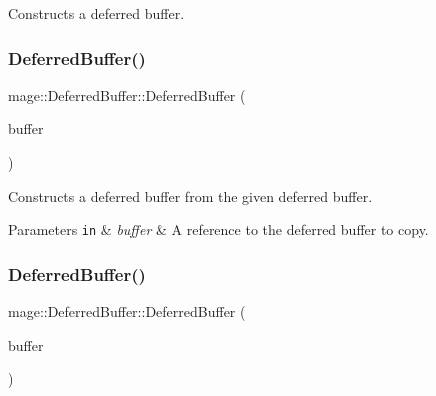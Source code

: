Constructs a deferred buffer. \hypertarget{structmage_1_1_deferred_buffer_ad796b5dcb9cf2e912a08054f2be16692}{}\label{structmage_1_1_deferred_buffer_ad796b5dcb9cf2e912a08054f2be16692} 
\subsubsection{\texorpdfstring{Deferred\+Buffer()}{DeferredBuffer()}\hspace{0.1cm}{\footnotesize\ttfamily [2/3]}}
{\footnotesize\ttfamily mage\+::\+Deferred\+Buffer\+::\+Deferred\+Buffer (\begin{DoxyParamCaption}\item[{const \hyperlink{structmage_1_1_deferred_buffer}{Deferred\+Buffer} \&}]{buffer }\end{DoxyParamCaption})\hspace{0.3cm}{\ttfamily [default]}}

Constructs a deferred buffer from the given deferred buffer.


\begin{DoxyParams}[1]{Parameters}
\mbox{\tt in}  & {\em buffer} & A reference to the deferred buffer to copy. \\
\hline
\end{DoxyParams}
\hypertarget{structmage_1_1_deferred_buffer_a525c6c26dfe871840328ee8953765071}{}\label{structmage_1_1_deferred_buffer_a525c6c26dfe871840328ee8953765071} 
\subsubsection{\texorpdfstring{Deferred\+Buffer()}{DeferredBuffer()}\hspace{0.1cm}{\footnotesize\ttfamily [3/3]}}
{\footnotesize\ttfamily mage\+::\+Deferred\+Buffer\+::\+Deferred\+Buffer (\begin{DoxyParamCaption}\item[{\hyperlink{structmage_1_1_deferred_buffer}{Deferred\+Buffer} \&\&}]{buffer }\end{DoxyParamCaption})\hspace{0.3cm}{\ttfamily [default]}}


